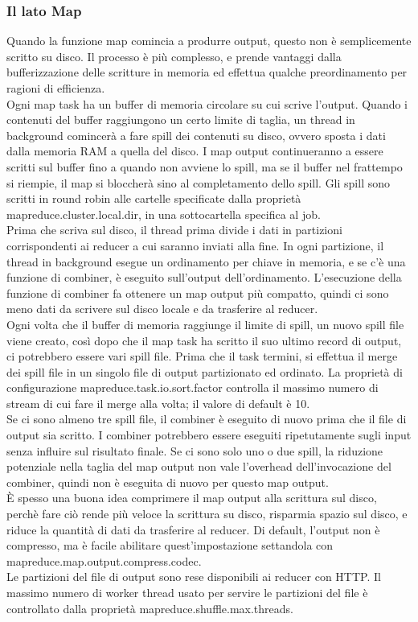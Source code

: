 \subsubsection{Il lato Map}
Quando la funzione map comincia a produrre output, questo non è semplicemente scritto su disco. Il processo è più complesso, e prende vantaggi dalla bufferizzazione delle scritture in memoria ed effettua qualche preordinamento per ragioni di efficienza. \\
Ogni map task ha un buffer di memoria circolare su cui scrive l'output. Quando i contenuti del buffer raggiungono un certo limite di taglia, un thread in background comincerà a fare spill dei contenuti su disco, ovvero sposta i dati  dalla memoria RAM a quella del disco. I map output continueranno a essere scritti sul buffer fino a quando non avviene lo spill, ma se il buffer nel frattempo si riempie, il map si bloccherà sino al completamento dello spill. Gli spill sono scritti in round robin alle cartelle specificate dalla proprietà mapreduce.cluster.local.dir, in una sottocartella specifica al job. \\
Prima che scriva sul disco, il thread prima divide i dati in partizioni corrispondenti ai reducer a cui saranno inviati alla fine. In ogni partizione, il thread in background esegue un ordinamento per chiave in memoria, e se c'è una funzione di combiner, è eseguito sull'output dell'ordinamento. L'esecuzione della funzione di combiner fa ottenere un map output più compatto, quindi ci sono meno dati da scrivere sul disco locale e da trasferire al reducer. \\
Ogni volta che il buffer di memoria raggiunge il limite di spill, un nuovo spill file viene creato, così dopo che il map task ha scritto il suo ultimo record di output, ci potrebbero essere vari spill file. Prima che il task termini, si effettua il merge dei spill file in un singolo file di output partizionato ed ordinato. La proprietà di configurazione mapreduce.task.io.sort.factor controlla il massimo numero di stream di cui fare il merge alla volta; il valore di default è 10. \\
Se ci sono almeno tre spill file, il combiner è eseguito di nuovo prima che il file di output sia scritto. I combiner potrebbero essere eseguiti ripetutamente sugli input senza influire sul risultato finale. Se ci sono solo uno o due spill, la riduzione potenziale nella taglia del map output non vale l'overhead dell'invocazione del combiner, quindi non è eseguita di nuovo per questo map output. \\
È spesso una buona idea comprimere il map output alla scrittura sul disco, perchè fare ciò rende più veloce la scrittura su disco, risparmia spazio sul disco, e riduce la quantità di dati da trasferire al reducer. Di default, l'output non è compresso, ma è facile abilitare quest'impostazione settandola con mapreduce.map.output.compress.codec. \\
Le partizioni del file di output sono rese disponibili ai reducer con HTTP. Il massimo numero di worker thread usato per servire le partizioni del file è controllato dalla proprietà mapreduce.shuffle.max.threads. \\
